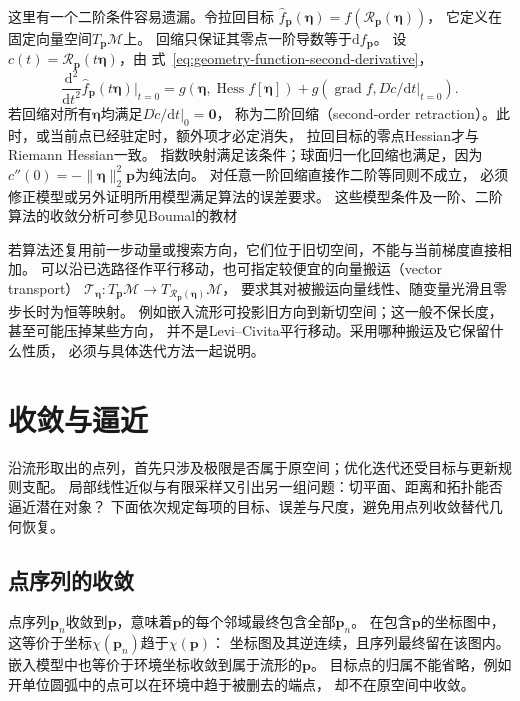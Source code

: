 这里有一个二阶条件容易遗漏。令拉回目标
$\widehat f_{\bm p}(\bm\eta)=f(\mathcal R_{\bm p}(\bm\eta))$，
它定义在固定向量空间$T_{\bm p}\mathcal M$上。
回缩只保证其零点一阶导数等于$\mathrm df_{\bm p}$。
设$c(t)=\mathcal R_{\bm p}(t\bm\eta)$，由
式~\eqref{eq:geometry-function-second-derivative}，
\begin{equation}
 \frac{\mathrm d^2}{\mathrm dt^2}\widehat f_{\bm p}(t\bm\eta)
 \bigg|_{t=0}
 =g(\bm\eta,\operatorname{Hess}f[\bm\eta])
  +g(\operatorname{grad}f,D\dot c/\mathrm dt|_{t=0}).
 \label{eq:geometry-retraction-pullback-hessian}
\end{equation}
若回缩对所有$\bm\eta$均满足$D\dot c/\mathrm dt|_0=\bm0$，
称为二阶回缩（second-order retraction）。此时，或当前点已经驻定时，额外项才必定消失，
拉回目标的零点Hessian才与Riemann Hessian一致。
指数映射满足该条件；球面归一化回缩也满足，因为
$c''(0)=-\lVert\bm\eta\rVert_2^2\bm p$为纯法向。
对任意一阶回缩直接作二阶等同则不成立，
必须修正模型或另外证明所用模型满足算法的误差要求。
这些模型条件及一阶、二阶算法的收敛分析可参见Boumal的教材

若算法还复用前一步动量或搜索方向，它们位于旧切空间，不能与当前梯度直接相加。
可以沿已选路径作平行移动，也可指定较便宜的向量搬运（vector transport）
$\mathcal T_{\bm\eta}:T_{\bm p}\mathcal M\to
T_{\mathcal R_{\bm p}(\bm\eta)}\mathcal M$，
要求其对被搬运向量线性、随变量光滑且零步长时为恒等映射。
例如嵌入流形可投影旧方向到新切空间；这一般不保长度，甚至可能压掉某些方向，
并不是Levi--Civita平行移动。采用哪种搬运及它保留什么性质，
必须与具体迭代方法一起说明。

\section{收敛与逼近}
\label{sec:geometry-convergence-approximation}

沿流形取出的点列，首先只涉及极限是否属于原空间；优化迭代还受目标与更新规则支配。
局部线性近似与有限采样又引出另一组问题：切平面、距离和拓扑能否逼近潜在对象？
下面依次规定每项的目标、误差与尺度，避免用点列收敛替代几何恢复。

\subsection{点序列的收敛}
\label{sec:geometry-point-convergence}

点序列$\bm p_n$收敛到$\bm p$，意味着$\bm p$的每个邻域最终包含全部$\bm p_n$。
在包含$\bm p$的坐标图中，这等价于坐标$\chi(\bm p_n)$趋于$\chi(\bm p)$：
坐标图及其逆连续，且序列最终留在该图内。嵌入模型中也等价于环境坐标收敛到属于流形的$\bm p$。
目标点的归属不能省略，例如开单位圆弧中的点可以在环境中趋于被删去的端点，
却不在原空间中收敛。

